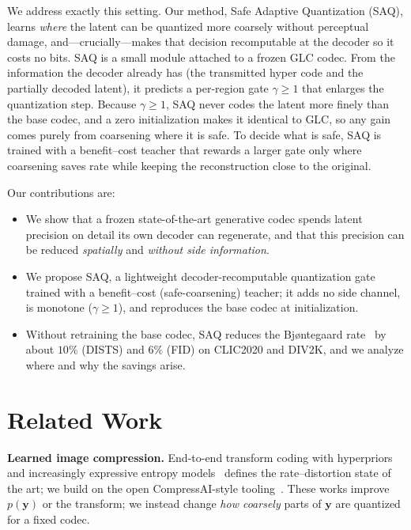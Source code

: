 \documentclass[conference]{IEEEtran}
\newcommand{\yy}{\mathbf{y}}
\begin{document}
We address exactly this setting. Our method, Safe Adaptive Quantization (SAQ),
learns \emph{where} the latent can be quantized more coarsely without perceptual
damage, and---crucially---makes that decision recomputable at the decoder so it
costs no bits. SAQ is a small module attached to a frozen GLC codec. From the
information the decoder already has (the transmitted hyper code and the partially
decoded latent), it predicts a per-region gate $\gamma\!\ge\!1$ that enlarges the
quantization step. Because $\gamma\!\ge\!1$, SAQ never codes the latent more
finely than the base codec, and a zero initialization makes it identical to GLC,
so any gain comes purely from coarsening where it is safe. To decide what is
safe, SAQ is trained with a benefit--cost teacher that rewards a larger gate only
where coarsening saves rate while keeping the reconstruction close to the
original.

Our contributions are:
\begin{itemize}
\item We show that a frozen state-of-the-art generative codec spends latent
precision on detail its own decoder can regenerate, and that this precision can
be reduced \emph{spatially} and \emph{without side information}.
\item We propose SAQ, a lightweight decoder-recomputable quantization gate
trained with a benefit--cost (safe-coarsening) teacher; it adds no side channel,
is monotone ($\gamma\!\ge\!1$), and reproduces the base codec at initialization.
\item Without retraining the base codec, SAQ reduces the Bj{\o}ntegaard
rate~\cite{bjontegaard2001calculation} by about $10\%$ (DISTS) and $6\%$ (FID) on
CLIC2020 and DIV2K, and we analyze where and why the savings arise.
\end{itemize}

\section{Related Work}
\label{sec:related}
\textbf{Learned image compression.}
End-to-end transform coding with hyperpriors~\cite{balle2017end,balle2018variational}
and increasingly expressive entropy
models~\cite{minnen2018joint,minnen2020channel,cheng2020learned,he2022elic,liu2023tcm}
defines the rate--distortion state of the art; we build on the open
CompressAI-style tooling~\cite{begaint2020compressai}. These works improve
$p(\yy)$ or the transform; we instead change \emph{how coarsely} parts of $\yy$
are quantized for a fixed codec.
\end{document}
